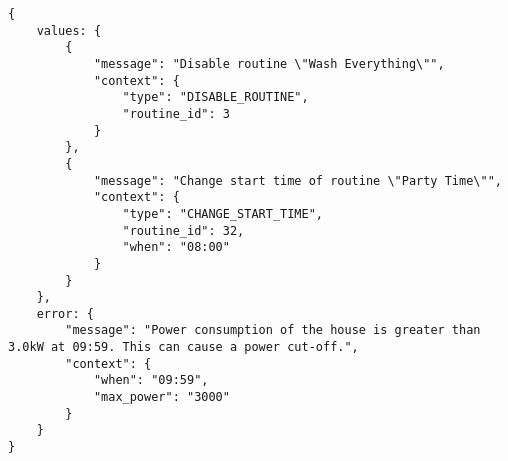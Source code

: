 \begin{lstlisting}[language=plain,caption={Response to HTTP POST request to the \textit{/simulate} endpoint},label=code:api_response_simulate,float,floatplacement=H]
{
    values: {
        {
            "message": "Disable routine \"Wash Everything\"",
            "context": {
                "type": "DISABLE_ROUTINE",
                "routine_id": 3
            }
        },
        {
            "message": "Change start time of routine \"Party Time\"",
            "context": {
                "type": "CHANGE_START_TIME",
                "routine_id": 32,
                "when": "08:00"
            }
        }
    },
    error: {
        "message": "Power consumption of the house is greater than 3.0kW at 09:59. This can cause a power cut-off.",
        "context": {
            "when": "09:59",
            "max_power": "3000"
        }
    }
}
\end{lstlisting}